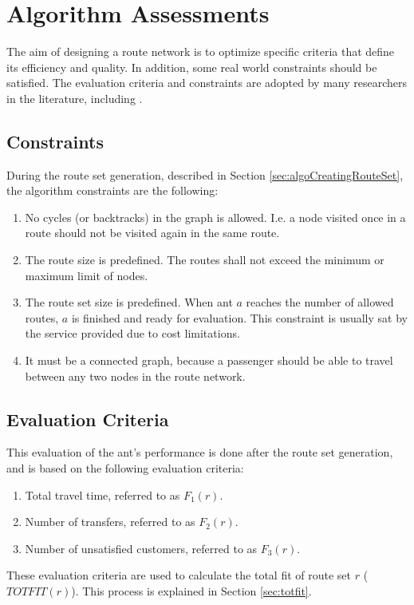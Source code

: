 \section{Algorithm Assessments}
The aim of designing a route network is to optimize specific criteria that define its efficiency and quality. In addition, some real world constraints should be satisfied. The evaluation criteria and constraints are adopted by many researchers in the literature, including \citet{kechagiopoulos14}.

\subsection{Constraints}
\label{sec:algoConstraints}
During the route set generation, described in Section \vref{sec:algoCreatingRouteSet}, the algorithm constraints are the following:
\begin{enumerate}
\item \label{itm:constraintCycles} No cycles (or backtracks) in the graph is allowed. I.e. a node visited once in a route should not be visited again in the same route. 
\item \label{itm:constraintRouteSize} The route size is predefined. The routes shall not exceed the minimum or maximum limit of nodes.
\item \label{itm:constraintRouteSetSize} The route set size is predefined. When ant $a$ reaches the number of allowed routes, $a$ is finished and ready for evaluation. This constraint is usually sat by the service provided due to cost limitations.
\item \label{itm:criteriaConnectedGraph} It must be a connected graph, because a passenger should be able to travel between any two nodes in the route network.
\end{enumerate}

\subsection{Evaluation Criteria} 
This evaluation of the ant's performance is done after the route set generation, and is based on the following evaluation criteria:
\begin{enumerate}
\item \label{itm:criteriaTotalTravelTime} Total travel time, referred to as $F_1(r)$.
\item \label{itm:f2} Number of transfers, referred to as $F_2(r)$.
\item Number of unsatisfied customers, referred to as $F_3(r)$. 
\end{enumerate}
These evaluation criteria are used to calculate the total fit of route set $r$ ($TOTFIT(r)$). This process is explained in Section \vref{sec:totfit}.



